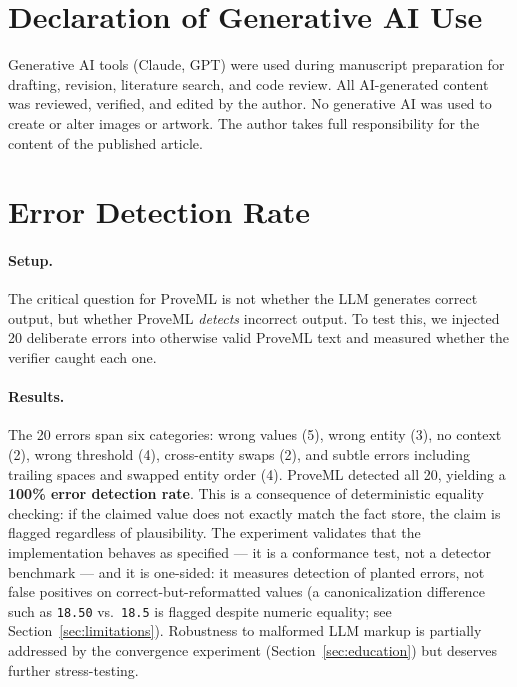 \documentclass[11pt,a4paper]{article}
\begin{document}
\section*{Declaration of Generative AI Use}

Generative AI tools (Claude, GPT) were used during manuscript preparation for drafting, revision, literature search, and code review. All AI-generated content was reviewed, verified, and edited by the author. No generative AI was used to create or alter images or artwork. The author takes full responsibility for the content of the published article.




\appendix

\section{Error Detection Rate}
\label{sec:detection}

\paragraph{Setup.} The critical question for ProveML is not whether the LLM generates correct output, but whether ProveML \textit{detects} incorrect output. To test this, we injected 20 deliberate errors into otherwise valid ProveML text and measured whether the verifier caught each one.

\paragraph{Results.} The 20 errors span six categories: wrong values (5), wrong entity (3), no context (2), wrong threshold (4), cross-entity swaps (2), and subtle errors including trailing spaces and swapped entity order (4). ProveML detected all 20, yielding a \textbf{100\% error detection rate}. This is a consequence of deterministic equality checking: if the claimed value does not exactly match the fact store, the claim is flagged regardless of plausibility. The experiment validates that the implementation behaves as specified --- it is a conformance test, not a detector benchmark --- and it is one-sided: it measures detection of planted errors, not false positives on correct-but-reformatted values (a canonicalization difference such as \texttt{18.50} vs.\ \texttt{18.5} is flagged despite numeric equality; see Section~\ref{sec:limitations}). Robustness to malformed LLM markup is partially addressed by the convergence experiment (Section~\ref{sec:education}) but deserves further stress-testing.
\end{document}
